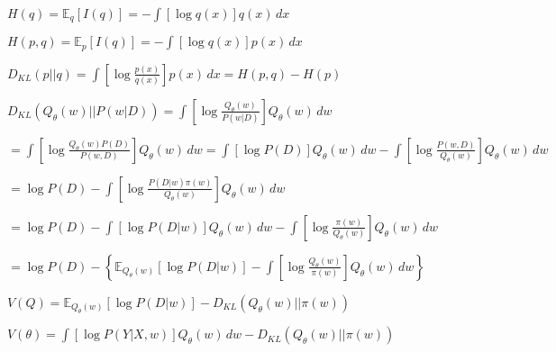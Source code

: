 \documentclass[multi={mymath},border=1pt,convert={convertexe={convert},density=300,size=800x800,outext=.png}]{standalone}
\newenvironment{mymath}{$\displaystyle}{$}
\def\E{{\mathbb{E}}}            %
\def\Cov{ {\textrm{Cov}} }
\def\|{{|\!|}}
\def\yobs{ {y_{\textrm{obs}}} }
\begin{document}
\begin{mymath}
H(q) = \E_q [I(q)] = - \int [\log q(x)] q(x)\,dx
\end{mymath}

\begin{mymath}
H(p, q) = \E_p[I(q)] = - \int [\log q(x)] p(x)\,dx
\end{mymath}

\begin{mymath}
D_{KL}(p \| q) = \int \left[ \log \frac{p(x)}{q(x)} \right] p(x)\,dx = H(p, q) - H(p)
\end{mymath}

\begin{mymath}
D_{KL}(Q_{\theta}(w) \| P(w | D)) = \int \left[ \log \frac{Q_{\theta}(w)}{P(w | D)} \right] Q_{\theta}(w)\,dw
\end{mymath}

\begin{mymath}
= \int \left[ \log \frac{Q_{\theta}(w)P(D)}{P(w, D)} \right] Q_{\theta}(w)\,dw = \int \left[ \log P(D) \right] Q_{\theta}(w)\,dw - \int \left[ \log \frac{P(w, D)}{Q_{\theta}(w)} \right] Q_{\theta}(w)\,dw
\end{mymath}

\begin{mymath}
= \log P(D) - \int \left[ \log \frac{P(D | w) \pi(w)}{Q_{\theta}(w)} \right] Q_{\theta}(w)\,dw
\end{mymath}

\begin{mymath}
= \log P(D) - \int \left[ \log P(D | w) \right] Q_{\theta}(w)\,dw - \int \left[ \log \frac{\pi(w)}{Q_{\theta}(w)} \right] Q_{\theta}(w)\,dw
\end{mymath}

\begin{mymath}
= \log P(D) - \left\{  \E_{Q_{\theta}(w)}[ \log P(D | w) ] - \int \left[ \log \frac{Q_{\theta}(w)}{\pi(w)} \right] Q_{\theta}(w)\,dw \right\}
\end{mymath}

\begin{mymath}
V(Q) = \E_{Q_{\theta}(w)}[ \log P(D | w) ] - D_{KL}(Q_{\theta}(w) \| \pi(w))
\end{mymath}

\begin{mymath}
V(\theta) = \int [ \log P(Y | X, w) ] Q_{\theta}(w)\,dw - D_{KL}(Q_{\theta}(w) \| \pi(w))
\end{mymath}




\end{document}
